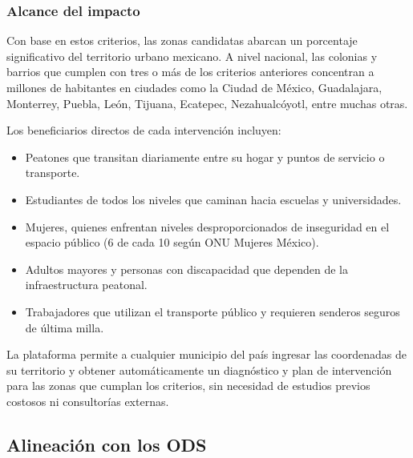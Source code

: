 \documentclass[12pt,a4paper]{article}
\begin{document}
\subsubsection{Alcance del impacto}

Con base en estos criterios, las zonas candidatas abarcan un porcentaje significativo del territorio urbano mexicano. A nivel nacional, las colonias y barrios que cumplen con tres o más de los criterios anteriores concentran a millones de habitantes en ciudades como la Ciudad de México, Guadalajara, Monterrey, Puebla, León, Tijuana, Ecatepec, Nezahualcóyotl, entre muchas otras.

Los beneficiarios directos de cada intervención incluyen:

\begin{itemize}[leftmargin=1.5cm]
    \item Peatones que transitan diariamente entre su hogar y puntos de servicio o transporte.
    \item Estudiantes de todos los niveles que caminan hacia escuelas y universidades.
    \item Mujeres, quienes enfrentan niveles desproporcionados de inseguridad en el espacio público (6 de cada 10 según ONU Mujeres México).
    \item Adultos mayores y personas con discapacidad que dependen de la infraestructura peatonal.
    \item Trabajadores que utilizan el transporte público y requieren senderos seguros de última milla.
\end{itemize}

La plataforma permite a cualquier municipio del país ingresar las coordenadas de su territorio y obtener automáticamente un diagnóstico y plan de intervención para las zonas que cumplan los criterios, sin necesidad de estudios previos costosos ni consultorías externas.

\subsection{Alineación con los ODS}
\end{document}
